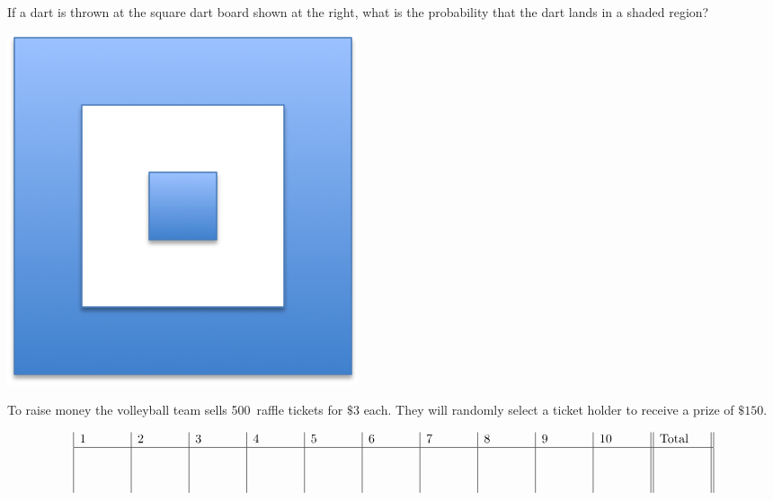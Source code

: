 \documentclass[addpoints,12pt]{exam}
\begin{document}
\begin{questions}
\question[10]
\begin{multicols}{2}
If a dart is thrown at the square dart board shown at the right,
what is the probability that the dart lands in a shaded region?\\
\begin{center}\includegraphics[scale=.75]{Dart}\end{center}
\end{multicols}
\vspace{1in}

\question[10] To raise money the volleyball team sells 500~raffle tickets
for $\$3$ each. They will randomly select a ticket holder to receive
a prize of $\$150$.

\end{questions}

\vfill
\[\begin{array}
{|p{.5in}|p{.5in}|p{.5in}|p{.5in}|p{.5in}|p{.5in}|p{.5in}|p{.5in}|p{.5in}|p{.5in}||p{.5in}||}
1&2&3&4&5&6&7&8&9&10&\text{Total}\\\hline
\vspace{.5in}&&&&&&&&&&
\end{array}\]
\end{document}
